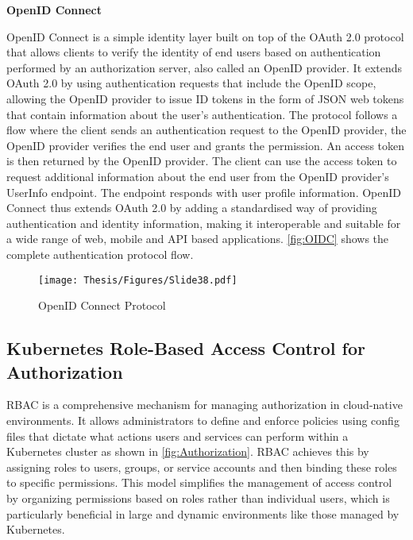 \clearpage

\textbf{OpenID Connect}

OpenID Connect is a simple identity layer built on top of the OAuth 2.0 protocol that allows clients to verify the identity of end users based on authentication performed by an authorization server, also called an OpenID provider. It extends OAuth 2.0 by using authentication requests that include the OpenID scope, allowing the OpenID provider to issue ID tokens in the form of JSON web tokens  that contain information about the user's authentication. The protocol follows a flow where the client sends an authentication request to the OpenID provider, the OpenID provider verifies the end user and grants the permission. An access token is then returned by the OpenID provider. The client can use the access token to request additional information about the end user from the OpenID provider's UserInfo endpoint. The endpoint responds with user profile information. OpenID Connect thus extends OAuth 2.0 by adding a standardised way of providing authentication and identity information, making it interoperable and suitable for a wide range of web, mobile and API based applications. \autoref{fig:OIDC} shows the complete authentication protocol flow. \cite{openid-connect-core-1_0}


\captionsetup{justification=centering}
\begin{figure}[h]
\centering
\texttt{[image: Thesis/Figures/Slide38.pdf]}
\caption{\label{fig:OIDC}OpenID Connect Protocol \cite{openid-connect-core-1_0}}
\end{figure}

\subsection{Kubernetes Role-Based Access Control for Authorization}

RBAC is a comprehensive mechanism for managing authorization in cloud-native environments. It allows administrators to define and enforce policies using config files that dictate what actions users and services can perform within a Kubernetes cluster as shown in \autoref{fig:Authorization}. RBAC achieves this by assigning roles to users, groups, or service accounts and then binding these roles to specific permissions. This model simplifies the management of access control by organizing permissions based on roles rather than individual users, which is particularly beneficial in large and dynamic environments like those managed by Kubernetes. \cite{r40}
\clearpage

